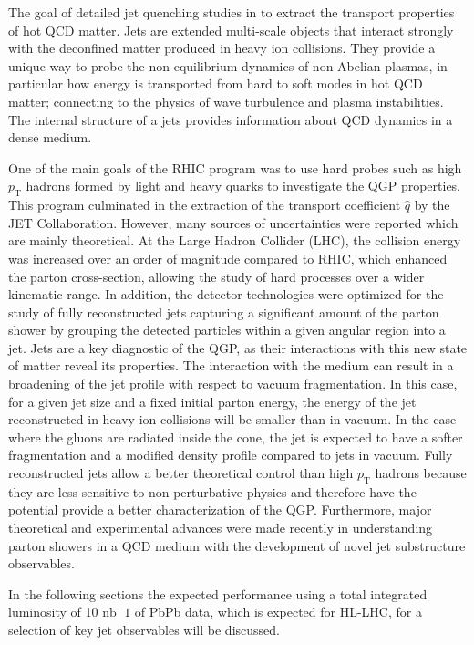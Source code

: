 The goal of detailed jet quenching studies in to extract the transport properties of hot QCD matter. Jets are extended multi-scale objects that interact strongly with the deconfined matter produced in heavy ion collisions. They provide a unique way to probe the non-equilibrium dynamics of non-Abelian plasmas, in particular how energy is transported from hard to soft modes in hot QCD matter; connecting to the physics of wave turbulence and plasma instabilities. The internal structure of a jets provides information about QCD dynamics in a dense medium.


One of the main goals of the RHIC program was to use hard probes such as high $p_{\mathrm{T}}$ hadrons formed by light and heavy quarks to investigate the QGP properties. This program culminated in the extraction of the transport coefficient $\hat q $ by the JET Collaboration. However, many sources of uncertainties were reported which are mainly theoretical. 
At the Large Hadron Collider (LHC), the collision energy was increased over an order of magnitude compared to RHIC, which enhanced the parton cross-section, allowing the study of hard processes over a wider kinematic range. In addition, the detector technologies were optimized for the study of fully reconstructed jets capturing a significant amount of the parton shower by grouping the detected particles within a given angular region into a jet. Jets are a key diagnostic of the QGP, as their interactions with this new state of matter reveal its properties. The interaction with the medium can result in a broadening of the jet profile with respect to vacuum fragmentation. In this case, for a given jet size and a fixed initial parton energy, the energy of the jet reconstructed in heavy ion collisions will be smaller than in vacuum. In the case where the gluons are radiated inside the cone, the jet is expected to have a softer fragmentation and a modified density profile compared to jets in vacuum. 
Fully reconstructed jets allow a better theoretical control than high $p_{\mathrm{T}}$ hadrons because they are less sensitive to non-perturbative physics and therefore have the potential provide a better characterization of the QGP. Furthermore, major theoretical and experimental advances were made recently in understanding parton showers in a QCD medium with the development of novel jet substructure observables.

In the following sections the expected performance using a total integrated luminosity of 10 $\mathrm{nb^-1}$ of PbPb data, which is expected for HL-LHC, for a selection of key jet observables will be discussed. %
